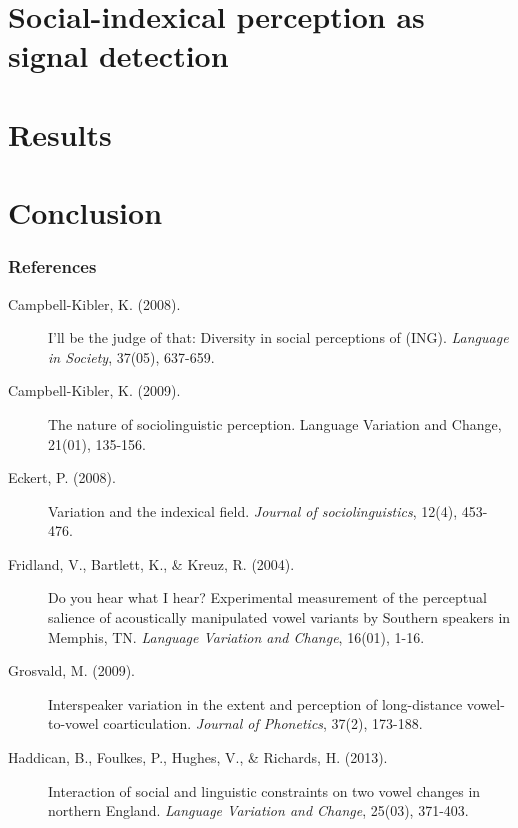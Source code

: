 \documentclass[a0,final]{a0poster}
\begin{document}
\begin{multicols}{4}
\section*{Social-indexical perception as signal detection}
\columnbreak
\section*{Results}
\section*{Conclusion}
\subsubsection*{References}
\vspace*{-.5cm}
\scriptsize
\begin{description}
\item[Campbell-Kibler, K. (2008).]{I'll be the judge of that: Diversity in social perceptions of (ING). \textit{Language in Society}, 37(05), 637-659.}\vspace*{0.2cm}

\item[Campbell-Kibler, K. (2009).]{The nature of sociolinguistic perception. Language Variation and Change, 21(01), 135-156.}

\item[Eckert, P. (2008).]{Variation and the indexical field. \textit{Journal of sociolinguistics}, 12(4), 453-476.}\vspace*{0.2cm}

\item[Fridland, V., Bartlett, K., \& Kreuz, R. (2004).]{Do you hear what I hear? Experimental measurement of the perceptual salience of acoustically manipulated vowel variants by Southern speakers in Memphis, TN. \textit{Language Variation and Change}, 16(01), 1-16.}\vspace*{0.2cm}

\item[Grosvald, M. (2009).]{Interspeaker variation in the extent and perception of long-distance vowel-to-vowel coarticulation. \textit{Journal of Phonetics}, 37(2), 173-188.}

\item[Haddican, B., Foulkes, P., Hughes, V., \& Richards, H. (2013).]{Interaction of social and linguistic constraints on two vowel changes in northern England. \textit{Language Variation and Change}, 25(03), 371-403.}


\end{description}
\end{multicols}
\end{document}
